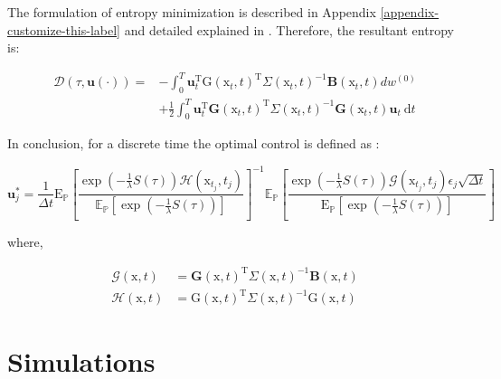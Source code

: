 \documentclass[]{hdsr}
\begin{document}
The formulation of entropy minimization is described in Appendix \ref{appendix-customize-this-label} and detailed explained in \citep{williams2016aggressive}. Therefore, the resultant entropy is:

\begin{equation}
\begin{aligned}
\mathcal{D}(\tau, \mathbf{u}(\cdot))=&-\int_{0}^{T} \mathbf{u}_{t}^{\mathrm{T}} \mathrm{G}\left(\mathrm{x}_{t}, t\right)^{\mathrm{T}} \Sigma\left(\mathrm{x}_{t}, t\right)^{-1} \mathbf{B}\left(\mathrm{x}_{t}, t\right) d w^{(0)} \\
&+\frac{1}{2} \int_{0}^{T} \mathbf{u}_{t}^{\mathrm{T}} \mathbf{G}\left(\mathrm{x}_{t}, t\right)^{\mathrm{T}} \Sigma\left(\mathrm{x}_{t}, t\right)^{-1} \mathbf{G}\left(\mathrm{x}_{t}, t\right) \mathbf{u}_{t} \mathrm{~d} t
\end{aligned}
\end{equation}

In conclusion, for a discrete time the optimal control is defined as : 

\begin{equation}
\mathbf{u}_{j}^{*}= \frac{1}{\Delta t} \mathrm{E}_{\mathbb{P}}\left[\frac{\exp \left(-\frac{1}{\lambda} S(\tau)\right) \mathcal{H}\left(\mathrm{x}_{t_{j}}, t_{j}\right)}{\mathbb{E}_{\mathbb{P}}\left[\exp \left(-\frac{1}{\lambda} S(\tau)\right)\right]}\right]^{-1} \mathbb{E}_{\mathbb{P}}\left[\frac{\exp \left(-\frac{1}{\lambda} S(\tau)\right) \mathcal{G}\left(\mathrm{x}_{t_{j}}, t_{j}\right) \epsilon_{j} \sqrt{\Delta t}}{\mathrm{E}_{\mathbb{P}}\left[\exp \left(-\frac{1}{\lambda} S(\tau)\right)\right]}\right] \label{eq:uj}
\end{equation}

where,

\begin{equation}
\begin{aligned}
\mathcal{G}(\mathrm{x}, t) &=\mathbf{G}(\mathrm{x}, t)^{\mathrm{T}} \Sigma(\mathrm{x}, t)^{-1} \mathbf{B}(\mathrm{x}, t) \\
\mathcal{H}(\mathrm{x}, t) &=\mathrm{G}(\mathrm{x}, t)^{\mathrm{T}} \Sigma(\mathrm{x}, t)^{-1} \mathrm{G}(\mathrm{x}, t)
\end{aligned}\label{eq:GH}
\end{equation}


\section{Simulations}
\end{document}
